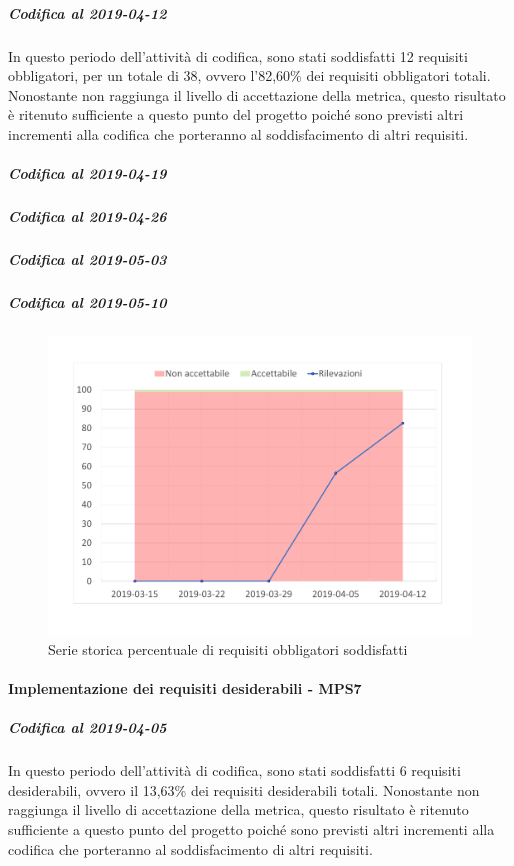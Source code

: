\subparagraph{Codifica al 2019-04-12}
In questo periodo dell'attività di codifica, sono stati soddisfatti 12 requisiti obbligatori, per un totale di 38, ovvero l'82,60\% dei requisiti obbligatori totali.
Nonostante non raggiunga il livello di accettazione della
metrica, questo risultato è ritenuto sufficiente a questo punto del progetto poiché sono previsti altri incrementi alla codifica che porteranno al soddisfacimento di altri requisiti.

\subparagraph{Codifica al 2019-04-19}

\subparagraph{Codifica al 2019-04-26}

\subparagraph{Codifica al 2019-05-03}

\subparagraph{Codifica al 2019-05-10}

\begin{figure}[H]
	\centering
	\includegraphics[scale=0.6]{images/resoconto/MPS6Chart.pdf}
	\caption{Serie storica percentuale di requisiti obbligatori soddisfatti}	
\end{figure}

\paragraph{Implementazione dei requisiti desiderabili - MPS7}
\subparagraph{Codifica al 2019-04-05}
In questo periodo dell'attività di codifica, sono stati soddisfatti 6 requisiti desiderabili, ovvero il 13,63\% dei requisiti desiderabili totali.
Nonostante non raggiunga il livello di accettazione della
metrica, questo risultato è ritenuto sufficiente a questo punto del progetto poiché sono previsti altri incrementi alla codifica che porteranno al soddisfacimento di altri requisiti.

